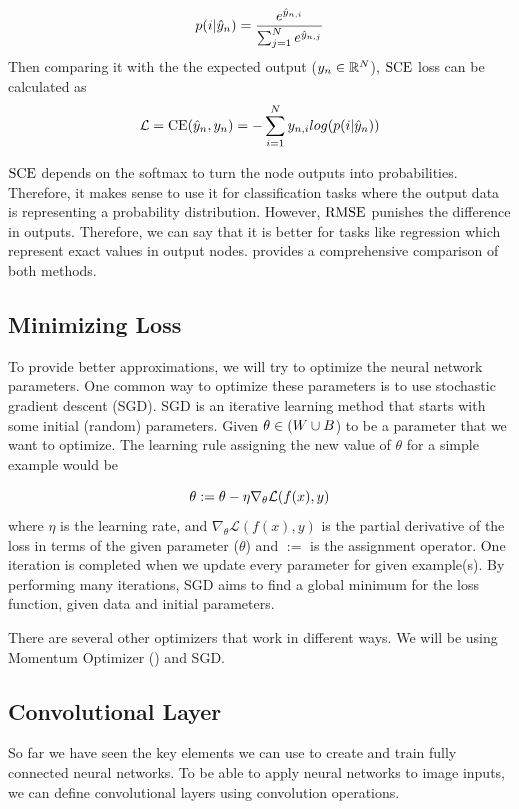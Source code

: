 $$p(i | \hat{y}_{n}) = \frac{e^{\hat{y}_{n,i}}}{\sum_{j=1}^{N}e^{\hat{y}_{n,j}}}$$
Then comparing it with the the expected output ($y_{n} \in \mathbb{R}^{N}$), $\textrm{SCE}$ loss can be calculated as
$$\mathcal{L} = \textrm{CE}(\hat{y}_{n}, y_{n}) = - \sum_{i=1}^{N} y_{n,i} log(p(i | \hat{y}_{n}))$$

$\textrm{SCE}$ depends on the softmax to turn the node outputs into probabilities. Therefore, it makes sense to use it for classification tasks where the output data is representing a probability distribution. However, $\textrm{RMSE}$ punishes the difference in outputs. Therefore, we can say that it is better for tasks like regression which represent exact values in output nodes. \cite{golik2013cross} provides a comprehensive comparison of both methods. 

\subsection{Minimizing Loss}
To provide better approximations, we will try to optimize the neural network parameters. One common way to optimize these parameters is to use stochastic gradient descent (SGD). SGD is an iterative learning method that starts with some initial (random) parameters. Given $\theta \in (\all\weights \cup \all\biasterm$) to be a parameter that we want to optimize. The learning rule assigning the new value of $\theta$ for a simple example would be

$$ \theta := \theta- \eta \nabla_\theta{\mathcal{L}(f(x),y)} $$
where $\eta$ is the learning rate, and $\nabla_\theta{\mathcal{L}(f(x), y)}$ is the partial derivative of the loss in terms of the given parameter ($\theta$) and $:=$ is the assignment operator. One iteration is completed when we update every parameter for given example(s). By performing many iterations, SGD aims to find a global minimum for the loss function, given data and initial parameters.

There are several other optimizers that work in different ways. We will be using Momentum Optimizer (\cite{qian1999momentum}) and SGD.

\subsection{Convolutional Layer}
So far we have seen the key elements we can use to create and train fully connected neural networks. To be able to apply neural networks to image inputs, we can define convolutional layers using convolution operations. 

